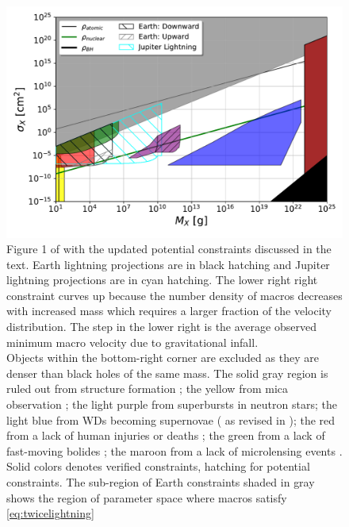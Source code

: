 \documentclass[%
 reprint,
 amsmath,amssymb,
 aps,
]{revtex4-2}
\newcommand{\vtwo}[1]{{\color{black} #1}}
\begin{document}


\begin{figure}
    \includegraphics[width=\textwidth]{lightning_constraints/lightningconstraints.pdf}
    \caption{
        Figure 1 of \vtwo{\citep{Sidhu2020reconsider}} with the updated \vtwo{potential} constraints discussed in the text. Earth lightning projections are in black hatching and Jupiter lightning projections are in cyan hatching. The lower right right constraint curves up because the number density of macros decreases with increased mass which requires a larger fraction of the velocity distribution. The step in the lower right is the average observed minimum macro velocity due to gravitational infall.
        \\
        Objects within the bottom-right corner are excluded as they are denser than black holes of the same mass. The {\color{gray} solid gray} region is ruled out from structure formation \vtwo{\citep{Wilkinson2014angular}}; the {\color{yellow} yellow} from mica observation \vtwo{\citep{DeRujula1984axn, Price1988ge}};  the light {\color{blue} purple} from superbursts in neutron stars; the {\color{cyan} light blue} from WDs becoming supernovae (\vtwo{\citet{Graham2018}} as revised in \vtwo{\citet{Sidhu2020reconsider}});  the {\color{red} red} from a lack of human injuries or deaths \vtwo{\citep{Sidhu2019death}}; the {\color{green} green} from a lack of fast-moving bolides \vtwo{\citep{Sidhu2019bolide}}; the {\color{purple} maroon} from a lack of microlensing events \vtwo{\citep{Niikura2019, Alcock2001, Tisserand2007, Carr2010, Griest2013}}. Solid colors denotes verified constraints, hatching for potential constraints.
        \vtwo{The sub-region of Earth constraints shaded in} {\color{gray} gray} \vtwo{shows the region of parameter space where macros satisfy \eqref{eq:twicelightning}}
    }\label{fig:constraints}
\end{figure}
\end{document}
